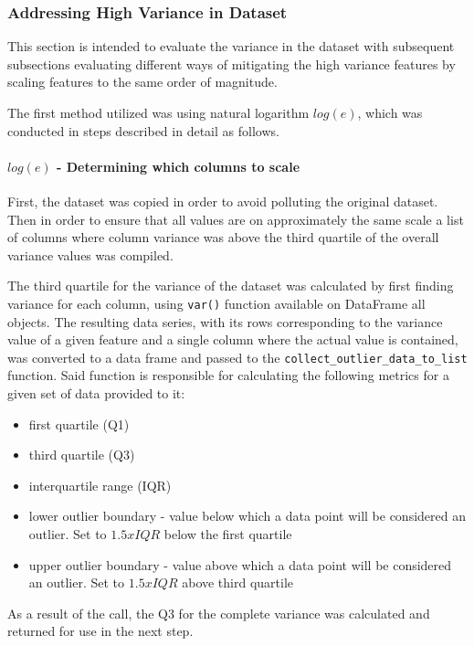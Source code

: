 \subsubsection{Addressing High Variance in Dataset}\label{sec:impl-data-analysis:dealing-with-variance}
This section is intended to evaluate the variance in the dataset with subsequent subsections evaluating different ways of mitigating the high variance features by scaling features to the same order of magnitude.

The first method utilized was using natural logarithm $log(e)$, which was conducted in steps described in detail as follows.
\paragraph{$log(e)$ - Determining which columns to scale}
First, the dataset was copied in order to avoid polluting the original dataset. Then in order to ensure that all values are on approximately the same scale a list of columns where column variance was above the third quartile of the overall variance values was compiled. 

The third quartile for the variance of the dataset was calculated by first finding variance for each column, using \texttt{var()} function available on DataFrame all objects. The resulting data series, with its rows corresponding to the variance value of a given feature and a single column where the actual value is contained, was converted to a data frame and passed to the \texttt{collect\_outlier\_data\_to\_list} function. Said function is responsible for calculating the following metrics for a given set of data provided to it:

\begin{itemize}
    \item first quartile (Q1)
    \item third quartile (Q3)
    \item interquartile range (IQR)
    \item lower outlier boundary - value below which a data point will be considered an outlier. Set to $1.5x IQR$ below the first quartile
    \item upper outlier boundary - value above which a data point will be considered an outlier. Set to $1.5x IQR$ above third quartile
\end{itemize}

As a result of the call, the Q3 for the complete variance was calculated and returned for use in the next step.

